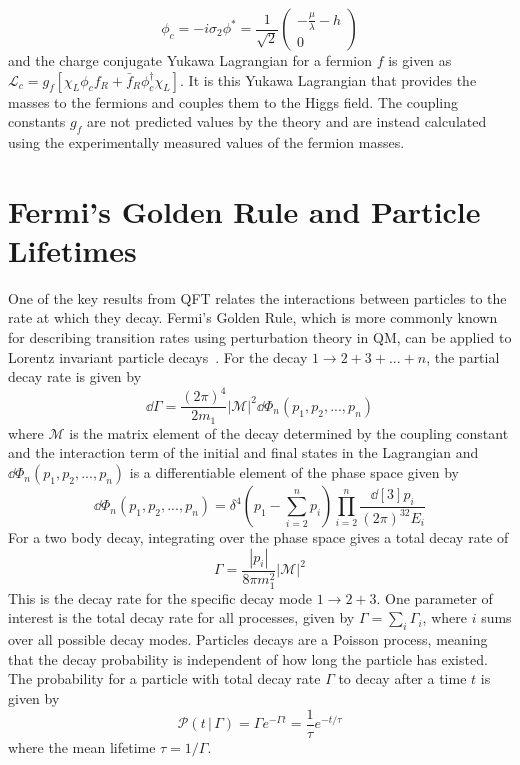 \begin{equation}
	\phi_c=-i\sigma_2\phi^*=\frac{1}{\sqrt{2}}\begin{pmatrix}-\frac{\mu}{\lambda}-h\\0\end{pmatrix}
\end{equation}
and the charge conjugate Yukawa Lagrangian for a fermion $f$ is given as $\mathcal{L}_c=g_f[\chi_L\phi_cf_R+\bar{f}_R\phi_c^\dagger\chi_L]$. It is this Yukawa Lagrangian that provides the masses to the fermions and couples them to the Higgs field. The coupling constants $g_f$ are not predicted values by the theory and are instead calculated using the experimentally measured values of the fermion masses.

\section{Fermi's Golden Rule and Particle Lifetimes} \label{sec:theory_fermi}
One of the key results from QFT relates the interactions between particles to the rate at which they decay. Fermi's Golden Rule, which is more commonly known for describing transition rates using perturbation theory in QM, can be applied to Lorentz invariant particle decays~\cite{pdg2024}. For the decay $1\to2+3+...+n$, the partial decay rate is given by
\begin{equation}
	\dd{\Gamma}=\frac{(2\pi)^4}{2m_1}|\mathcal{M}|^2\dd{\Phi_n(p_1,p_2,...,p_n)}
\end{equation}
where $\mathcal{M}$ is the matrix element of the decay determined by the coupling constant and the interaction term of the initial and final states in the Lagrangian and $\dd{\Phi_n(p_1,p_2,...,p_n)}$ is a differentiable element of the phase space given by
\begin{equation}
	\dd{\Phi_n(p_1,p_2,...,p_n)}=\delta^4(p_1-\sum_{i=2}^n p_i)\prod_{i=2}^n\frac{\dd[3]{p_i}}{(2\pi)^32E_i}
\end{equation}
For a two body decay, integrating over the phase space gives a total decay rate of
\begin{equation}
	\Gamma=\frac{|p_i|}{8\pi m_1^2}|\mathcal{M}|^2
\end{equation}
This is the decay rate for the specific decay mode $1\to2+3$. One parameter of interest is the total decay rate for all processes, given by $\Gamma=\sum_{i}\Gamma_i$, where $i$ sums over all possible decay modes. Particles decays are a Poisson process, meaning that the decay probability is independent of how long the particle has existed. The probability for a particle with total decay rate $\Gamma$ to decay after a time $t$ is given by
\begin{equation}
	\mathcal{P}(t\,|\,\Gamma)=\Gamma e^{-\Gamma t}=\frac{1}{\tau}e^{-t/\tau}
\end{equation}
where the mean lifetime $\tau=1/\Gamma$.

